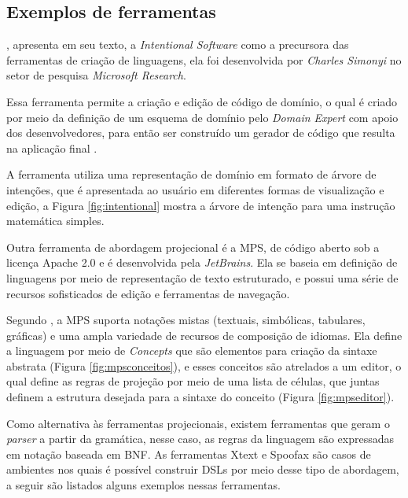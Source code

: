 \subsection{Exemplos de ferramentas}
\label{exemplosferramentasdsl}

, apresenta em seu texto, a \textit{Intentional Software} como a precursora das ferramentas de criação de linguagens, ela foi desenvolvida por \textit{Charles Simonyi} no setor de pesquisa \textit{Microsoft Research}. 

Essa ferramenta permite a criação e edição de código de domínio, o qual é criado por meio da definição de um esquema de domínio pelo \textit{Domain Expert} com apoio dos desenvolvedores, para então ser construído um gerador de código que resulta na aplicação final \cite{simonyi2006intentional}. 

A ferramenta utiliza uma representação de domínio em formato de árvore de intenções, que é apresentada ao usuário em diferentes formas de visualização e edição, a Figura \ref{fig:intentional} mostra a árvore de intenção para uma instrução matemática simples.



Outra ferramenta de abordagem projecional é a \gls{MPS}, de código aberto sob a licença Apache 2.0 e é desenvolvida pela \textit{JetBrains}. Ela se baseia em definição de linguagens por meio de representação de texto estruturado, e possui uma série de recursos sofisticados de edição e ferramentas de navegação. 

Segundo , a \gls{MPS} suporta notações mistas (textuais, simbólicas, tabulares, gráficas) e uma ampla variedade de recursos de composição de idiomas. Ela define a linguagem por meio de \textit{Concepts} que são elementos para criação da sintaxe abstrata (Figura \ref{fig:mpsconceitos}), e esses conceitos são atrelados a um editor, o qual define as regras de projeção por meio de uma lista de células, que juntas definem a estrutura desejada para a sintaxe do conceito (Figura \ref{fig:mpseditor}).





\newpage


Como alternativa às ferramentas projecionais, existem ferramentas que geram o \textit{parser} a partir da gramática, nesse caso, as regras da linguagem são expressadas em notação baseada em \gls{BNF}. As ferramentas Xtext e Spoofax são casos de ambientes nos quais é possível construir \gls{DSL}s por meio desse tipo de abordagem, a seguir são listados alguns exemplos nessas ferramentas.


